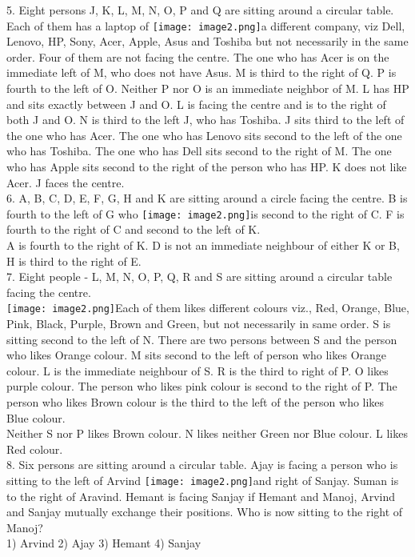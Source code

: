 \documentclass[
]{article}
\begin{document}
5. Eight persons J, K, L, M, N, O, P and Q are sitting around a circular table. Each of them has a
laptop of \texttt{[image: image2.png]}a different company, viz Dell, Lenovo, HP, Sony, Acer, Apple, Asus and Toshiba
but not necessarily in the same order. Four of them are not facing the centre. The one who
has Acer is on the immediate left of M, who does not have Asus. M is third to the right of Q.
P is fourth to the left of O. Neither P nor O is an immediate neighbor of M. L has HP and sits
exactly between J and O. L is facing the centre and is to the right of both J and O. N is third
to the left J, who has Toshiba. J sits third to the left of the one who has Acer. The one who
has Lenovo sits second to the left of the one who has Toshiba. The one who has Dell sits
second to the right of M. The one who has Apple sits second to the right of the person who
has HP. K does not like Acer. J faces the centre.\\

6. A, B, C, D, E, F, G, H and K are sitting around a circle facing the centre. B is fourth to the left
of G who \texttt{[image: image2.png]}is second to the right of C. F is fourth to the right of C and second to the left of K.\\
A is fourth to the right of K. D is not an immediate neighbour of either K or B, H is third to
the right of E.\\

7. Eight people - L, M, N, O, P, Q, R and S are sitting around a circular table facing the centre.\\
\texttt{[image: image2.png]}Each of them likes different colours viz., Red, Orange, Blue, Pink, Black, Purple, Brown and
Green, but not necessarily in same order. S is sitting second to the left of N. There are two
persons between S and the person who likes Orange colour. M sits second to the left of
person who likes Orange colour. L is the immediate neighbour of S. R is the third to right of
P. O likes purple colour. The person who likes pink colour is second to the right of P. The
person who likes Brown colour is the third to the left of the person who likes Blue colour.\\
Neither S nor P likes Brown colour. N likes neither Green nor Blue colour. L likes Red
colour.\\

8. Six persons are sitting around a circular table. Ajay is facing a person who is sitting to the
left of Arvind \texttt{[image: image2.png]}and right of Sanjay. Suman is to the right of Aravind. Hemant is facing Sanjay
if Hemant and Manoj, Arvind and Sanjay mutually exchange their positions. Who is now
sitting to the right of Manoj?\\
1) Arvind \hspace{2mm}2) Ajay \hspace{2mm}3) Hemant \hspace{2mm}4) Sanjay\\
\end{document}
